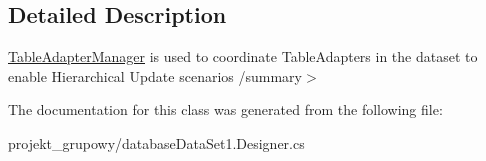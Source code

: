 \subsection{Detailed Description}
\hyperlink{classprojekt__grupowy_1_1database_data_set1_table_adapters_1_1_table_adapter_manager}{Table\+Adapter\+Manager} is used to coordinate Table\+Adapters in the dataset to enable Hierarchical Update scenarios /summary$>$ 

The documentation for this class was generated from the following file\+:\begin{DoxyCompactItemize}
\item 
projekt\+\_\+grupowy/database\+Data\+Set1.\+Designer.\+cs\end{DoxyCompactItemize}
